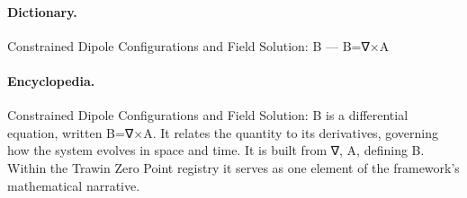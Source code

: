 \paragraph{Dictionary.}
Constrained Dipole Configurations and Field Solution: B — B=∇×A

\paragraph{Encyclopedia.}
Constrained Dipole Configurations and Field Solution: B is a differential equation, written B=∇×A. It relates the quantity to its derivatives, governing how the system evolves in space and time. It is built from ∇, A, defining B. Within the Trawin Zero Point registry it serves as one element of the framework's mathematical narrative.
